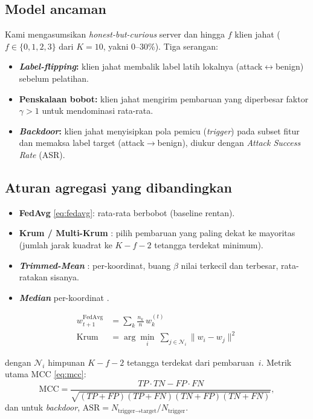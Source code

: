 \documentclass[11pt,a4paper]{article}
\begin{document}
\subsection{Model ancaman}
\label{sec:threat}
Kami mengasumsikan \emph{honest-but-curious} server dan hingga $f$ klien jahat
($f \in \{0,1,2,3\}$ dari $K{=}10$, yakni 0--30\%). Tiga serangan:
\begin{itemize}
  \item \textbf{\emph{Label-flipping}:} klien jahat membalik label latih lokalnya
  (attack$\leftrightarrow$benign) sebelum pelatihan.
  \item \textbf{Penskalaan bobot:} klien jahat mengirim pembaruan yang diperbesar
  faktor $\gamma>1$ untuk mendominasi rata-rata.
  \item \textbf{\emph{Backdoor}:} klien jahat menyisipkan pola pemicu (\emph{trigger})
  pada subset fitur dan memaksa label target (attack$\rightarrow$benign), diukur
  dengan \emph{Attack Success Rate} (ASR).
\end{itemize}

\subsection{Aturan agregasi yang dibandingkan}
\label{sec:agg}
\begin{itemize}
  \item \textbf{FedAvg} \eqref{eq:fedavg}: rata-rata berbobot (baseline rentan).
  \item \textbf{Krum / Multi-Krum} \cite{fkrum}: pilih pembaruan yang paling dekat
  ke mayoritas (jumlah jarak kuadrat ke $K{-}f{-}2$ tetangga terdekat minimum).
  \item \textbf{\emph{Trimmed-Mean}} \cite{ftrimmed}: per-koordinat, buang $\beta$
  nilai terkecil dan terbesar, rata-ratakan sisanya.
  \item \textbf{\emph{Median}} per-koordinat \cite{ftrimmed}.
\end{itemize}

\begin{align}
  w_{t+1}^{\text{FedAvg}} &= \sum_{k} \tfrac{n_k}{n}\, w_k^{(t)} \label{eq:fedavg}\\[2pt]
  \mathrm{Krum} &= \arg\min_{i}\ \textstyle\sum_{j \in \mathcal{N}_i} \lVert w_i - w_j \rVert^2 \label{eq:krum}
\end{align}

\noindent dengan $\mathcal{N}_i$ himpunan $K{-}f{-}2$ tetangga terdekat dari
pembaruan~$i$. Metrik utama MCC \eqref{eq:mcc}:
\begin{equation}
  \mathrm{MCC} = \frac{TP\cdot TN - FP\cdot FN}
  {\sqrt{(TP{+}FP)(TP{+}FN)(TN{+}FP)(TN{+}FN)}}, \label{eq:mcc}
\end{equation}
dan untuk \emph{backdoor}, $\mathrm{ASR} = N_{\text{trigger}\rightarrow\text{target}} / N_{\text{trigger}}$.
\end{document}
